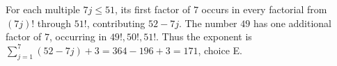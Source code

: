 For each multiple $7j\le51$, its first factor of $7$ occurs in every factorial from $(7j)!$ through $51!$, contributing $52-7j$. The number $49$ has one additional factor of $7$, occurring in $49!,50!,51!$. Thus the exponent is $\sum_{j=1}^7(52-7j)+3=364-196+3=\boxed{171}$, choice E.
